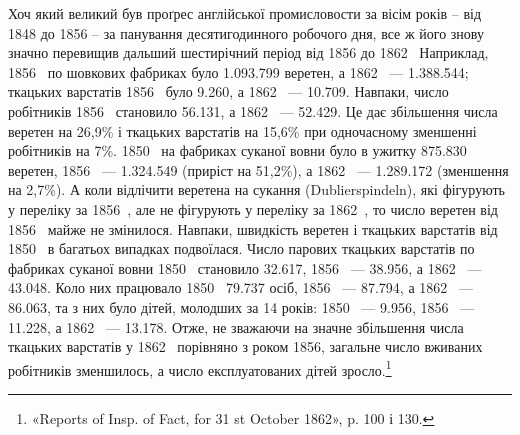 Хоч який великий був проґрес англійської промисловости
за вісім років – від 1848 до 1856 – за панування десятигодинного
робочого дня, все ж його знову значно перевищив дальший
шестирічний період від 1856 до 1862~ Наприклад, 1856~ по
шовкових фабриках було \num{1.093.799} веретен, а 1862~ — \num{1.388.544};
ткацьких варстатів 1856~ було \num{9.260}, а 1862~ — \num{10.709}. Навпаки,
число робітників 1856~ становило \num{56.131}, а 1862~ — \num{52.429}.
Це дає збільшення числа веретен на 26,9\% і ткацьких варстатів
на 15,6\% при одночасному зменшенні робітників на 7\%. 1850~ на
фабриках суканої вовни було в ужитку \num{875.830} веретен, 1856~ —
\num{1.324.549} (приріст на 51,2\%), а 1862~ — \num{1.289.172} (зменшення
на 2,7\%). А коли відлічити веретена на сукання (Dublierspindeln),
які фігурують у переліку за 1856~, але не фігурують у переліку
за 1862~, то число веретен від 1856~ майже не змінилося. Навпаки,
швидкість веретен і ткацьких варстатів від 1850~ в
багатьох випадках подвоїлася. Число парових ткацьких варстатів
по фабриках суканої вовни 1850~ становило \num{32.617},
1856~ — \num{38.956}, а 1862~ — \num{43.048}. Коло них працювало 1850~
\num{79.737} осіб, 1856~ — \num{87.794}, а 1862~ — \num{86.063}, та з них було
дітей, молодших за 14 років: 1850~ — \num{9.956}, 1856~ — \num{11.228},
а 1862~ — \num{13.178}. Отже, не зважаючи на значне збільшення
числа ткацьких варстатів у 1862~ порівняно з роком 1856, загальне
число вживаних робітників зменшилось, а число експлуатованих
дітей зросло.\footnote{
«Reports of Insp. of Fact, for 31 st October 1862», p. 100 і 130.
}

